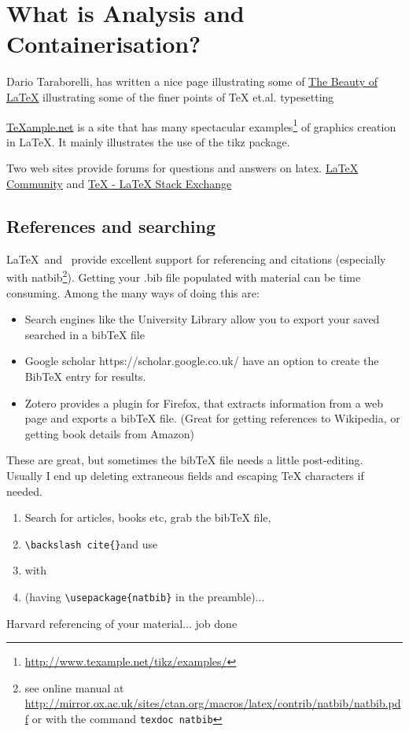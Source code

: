 
\chapter{What is Analysis and Containerisation?}

Dario Taraborelli, has written a nice page illustrating some of \href{http://nitens.org/taraborelli/latex}{The Beauty of LaTeX} illustrating some of the finer points of TeX et.al. typesetting

\url{TeXample.net} is a site that has many spectacular examples\footnote{\url{http://www.texample.net/tikz/examples/}} of graphics creation in LaTeX. It mainly illustrates the use of the tikz package.

Two web sites provide forums for questions and answers on latex. \href{http://www.latex-community.org/}{LaTeX Community} and \href{http://tex.stackexchange.com/}{TeX - LaTeX Stack Exchange}

\section{References and searching}

\LaTeX\ and \BibTeX\ provide excellent support for referencing and citations (especially with natbib\footnote{see online manual at \url{http://mirror.ox.ac.uk/sites/ctan.org/macros/latex/contrib/natbib/natbib.pdf} or with the command \texttt{texdoc natbib}}).  Getting your .bib file populated with material can be time consuming. Among the many ways of doing this are:
\begin{itemize}
\item    Search engines like the University Library allow you to export your saved searched in a bibTeX file
\item    Google scholar https://scholar.google.co.uk/ have an option to create the BibTeX entry for results.
\item    Zotero provides a plugin for Firefox, that extracts information from a web page and exports a bibTeX file. (Great for getting references to Wikipedia, or getting book details from Amazon)
\end{itemize}

These are great, but sometimes the bibTeX file needs a little post-editing. Usually I end up deleting extraneous fields and escaping TeX characters if needed.

\begin{enumerate}
\item Search for articles, books etc, grab the bibTeX file,
\item \verb"\backslash cite{}"and use
\item \verb"" with
\item \verb"" (having \verb"\usepackage{natbib}" in the preamble)...
\end{enumerate}
 Harvard referencing of your material... job done


